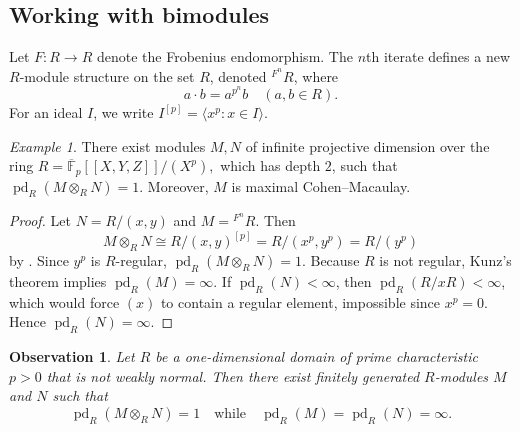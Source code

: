 \documentclass[11.05pt,a4paper]{amsart}
\newtheorem{observation}[theorem]{Observation}\newcommand{\up}[1]{{{}^{#1}\!}}
\theoremstyle{definition}
\theoremstyle{remark}
\newtheorem{example}[theorem]{Example}
\newcommand{\pd}{\operatorname{pd}}
\begin{document}
\subsection{Working with bimodules}

Let $F:R\to R$ denote the Frobenius endomorphism. The $n$th iterate defines a new $R$-module structure on the set $R$, denoted ${}^{{F^n}}\!R$, where
\[
a\cdot b = a^{p^n}b \quad (a,b\in R).
\]
For an ideal $I$, we write $I^{[p]}=\langle x^p : x\in I\rangle$.

\begin{example}
	There exist modules $M,N$ of infinite projective dimension over the ring
	\(
	R=\overline{\mathbb F}_p[[X,Y,Z]]/(X^p),
	\)
	which has depth $2$, such that $\pd_R(M\otimes_R N)=1$. Moreover, $M$ is maximal Cohen–Macaulay.
\end{example}

\begin{proof}
	Let $N=R/(x,y)$ and $M={}^{F^n}\!R$. Then
	\[
	M\otimes_R N \cong R/(x,y)^{[p]}=R/(x^p,y^p)=R/(y^p)
	\]
	by \cite[8.2.2(b)]{BH}. Since $y^p$ is $R$-regular,
	\(
	\pd_R(M\otimes_R N)=1.
	\) Because $R$ is not regular, Kunz's theorem \cite[8.2.8]{BH} implies $\pd_R(M)=\infty$. If $\pd_R(N)<\infty$, then $\pd_R(R/xR)<\infty$, which would force $(x)$ to contain a regular element, impossible since $x^p=0$. Hence $\pd_R(N)=\infty$.
\end{proof}
\begin{observation}
	Let $R$ be a one-dimensional domain of prime characteristic $p>0$ that is not weakly normal. Then there exist finitely generated $R$-modules $M$ and $N$ such that
	\[
	\pd_R(M\otimes_R N)=1 \quad \text{while} \quad \pd_R(M)=\pd_R(N)=\infty.
	\]
\end{observation}
\end{document}
